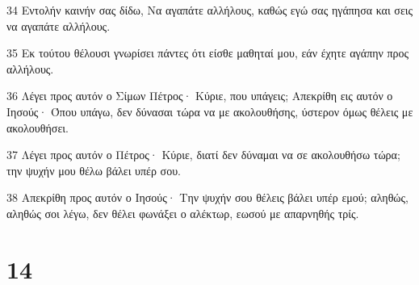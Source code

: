 \par 34 Εντολήν καινήν σας δίδω, Να αγαπάτε αλλήλους, καθώς εγώ σας ηγάπησα και σεις να αγαπάτε αλλήλους.
\par 35 Εκ τούτου θέλουσι γνωρίσει πάντες ότι είσθε μαθηταί μου, εάν έχητε αγάπην προς αλλήλους.
\par 36 Λέγει προς αυτόν ο Σίμων Πέτρος· Κύριε, που υπάγεις; Απεκρίθη εις αυτόν ο Ιησούς· Όπου υπάγω, δεν δύνασαι τώρα να με ακολουθήσης, ύστερον όμως θέλεις με ακολουθήσει.
\par 37 Λέγει προς αυτόν ο Πέτρος· Κύριε, διατί δεν δύναμαι να σε ακολουθήσω τώρα; την ψυχήν μου θέλω βάλει υπέρ σου.
\par 38 Απεκρίθη προς αυτόν ο Ιησούς· Την ψυχήν σου θέλεις βάλει υπέρ εμού; αληθώς, αληθώς σοι λέγω, δεν θέλει φωνάξει ο αλέκτωρ, εωσού με απαρνηθής τρίς.

\chapter{14}

